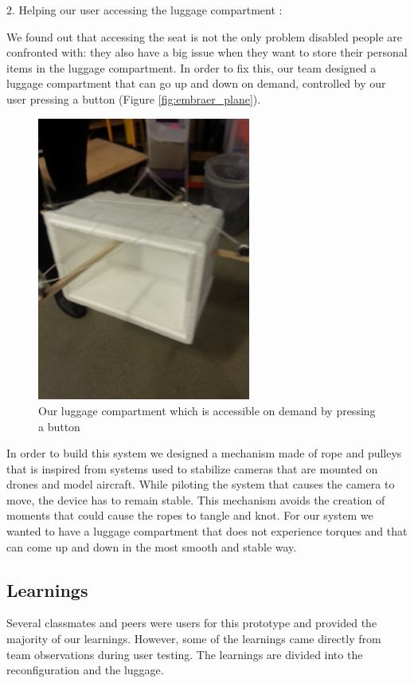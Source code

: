 2. Helping our user accessing the luggage compartment :

We found out that accessing the seat is not the only problem disabled people are confronted with: they also have a big issue when they want to store their personal items in the luggage compartment. In order to fix this, our team designed a luggage compartment that can go up and down on demand, controlled by our user pressing a button (Figure \ref{fig:embraer_plane}).

\begin{figure}[h]
  \centering
     \includegraphics[width=7cm]{images/20140130_170818.jpg}
   \caption{Our luggage compartment which is accessible on demand by pressing a button}
  \label{fig:our_luggage_compartment}
\end{figure}

In order to build this system we designed a mechanism made of rope and pulleys that is inspired from systems used to stabilize cameras that are mounted on drones and model aircraft. While piloting the system that causes the camera to move, the device has to remain stable. This mechanism avoids the creation of moments that could cause the ropes to tangle and knot. For our system we wanted to have a luggage compartment that does not experience torques and that can come up and down in the most smooth and stable way.

\subsection{Learnings}
Several classmates and peers were users for this prototype and provided the majority of our learnings.  However, some of the learnings came directly from team observations during user testing. The learnings are divided into the reconfiguration and the luggage. 

